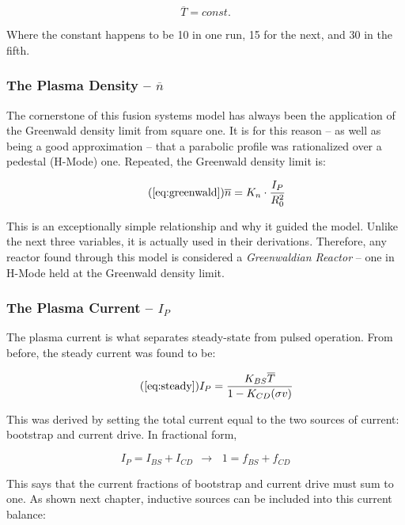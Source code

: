 \begin{equation}
	\label{eq:tbar}
	\overline T = const.
\end{equation}

Where the constant happens to be 10 in one run, 15 for the next, and 30 in the fifth.

\subsubsection{The Plasma Density -- $\overline n$}

The cornerstone of this fusion systems model has always been the application of the Greenwald density limit from square one. It is for this reason -- as well as being a good approximation -- that a parabolic profile was rationalized over a pedestal (H-Mode) one. Repeated, the Greenwald density limit is:

\begin{equation}
	\tag{\ref{eq:greenwald}}
	\overline n = K_n \cdot \frac{I_P}{R_0^2}
\end{equation}

This is an exceptionally simple relationship and why it guided the model. Unlike the next three variables, it is actually used in their derivations. Therefore, any reactor found through this model is considered a \emph{Greenwaldian Reactor} -- one in H-Mode held at the Greenwald density limit.

\subsubsection{The Plasma Current -- $I_P$}

The plasma current is what separates steady-state from pulsed operation. From before, the steady current was found to be:

\begin{equation}
	\tag{\ref{eq:steady}}
	I_P = \frac{K_{BS} \overline T}{1 - K_{CD} ( \sigma v ) }
\end{equation}

This was derived by setting the total current equal to the two sources of current: bootstrap and current drive. In fractional form,

\begin{equation}
	I_P = I_{BS} + I_{CD} \ \ \rightarrow \, \ \ 1 = f_{BS} + f_{CD}
\end{equation}

This says that the current fractions of bootstrap and current drive must sum to one. As shown next chapter, inductive sources can be included into this current balance:

